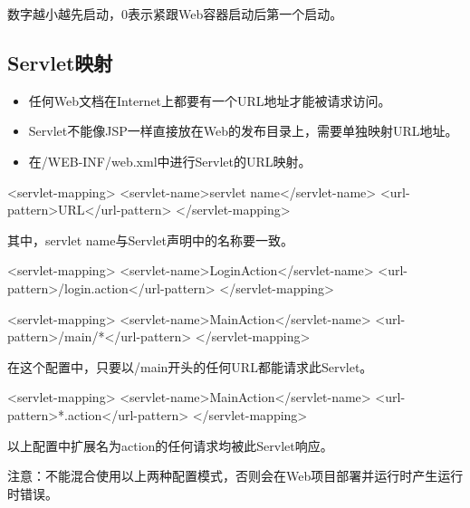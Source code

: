 数字越小越先启动，0表示紧跟Web容器启动后第一个启动。


\subsection{Servlet映射}

\begin{itemize}
\item 任何Web文档在Internet上都要有一个URL地址才能被请求访问。
\item Servlet不能像JSP一样直接放在Web的发布目录上，需要单独映射URL地址。
\item 在{\Red /WEB-INF/web.xml}中进行Servlet的URL映射。
\end{itemize}


\begin{xmlCode}
  <servlet-mapping>
    <servlet-name>servlet name</servlet-name>
    <url-pattern>URL</url-pattern>
  </servlet-mapping>
\end{xmlCode}

{\kai 其中，servlet name与Servlet声明中的名称要一致。}


\begin{xmlCode}
  <servlet-mapping>
    <servlet-name>LoginAction</servlet-name>
    <url-pattern>/login.action</url-pattern>
  </servlet-mapping>
\end{xmlCode}


\begin{xmlCode}
  <servlet-mapping>
    <servlet-name>MainAction</servlet-name>
    <url-pattern>/main/*</url-pattern>
  </servlet-mapping>
\end{xmlCode}

在这个配置中，只要以/main开头的任何URL都能请求此Servlet。


\begin{xmlCode}
  <servlet-mapping>
    <servlet-name>MainAction</servlet-name>
    <url-pattern>*.action</url-pattern>
  </servlet-mapping>
\end{xmlCode}

以上配置中扩展名为action的任何请求均被此Servlet响应。

{\Red\kai 注意：不能混合使用以上两种配置模式，否则会在Web项目部署并运行时产生运行时错误。}

